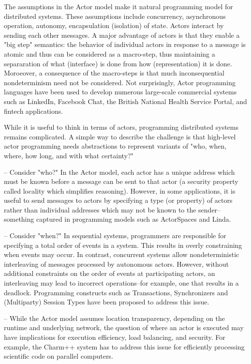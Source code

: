 The assumptions in the Actor model make it natural programming model
for distributed systems.  These assumptions include concurrency,
asynchronous operation, autonomy, encapsulation (isolation) of state.
Actors interact by sending each other messages.  A major advantage of
actors is that they enable a "big step" semantics: the behavior of
individual actors in response to a message is atomic and thus can be
considered as a macro-step, thus maintaining a separaration of what
(interface) is done from how (representation) it is done.  Moroeover,
a consequence of the macro-steps is that much inconsequential
nondeterminism need not be considered.  Not surprisingly, Actor
programming languages have been used to develop numerous large-scale
commercial systems such as LinkedIn, Facebook Chat, the British
National Health Service Portal, and fintech applications.

While it is useful to think in terms of actors, programming
distributed systems remains complicated.  A simple way to describe the
challenge is that high-level actor programming needs abstractions to
represent variants of "who, when, where, how long, and with what
certainty?"

-- Consider "who?"  In the Actor model, each actor has a unique
address which must be known before a message can be sent to that actor
(a security property called locality which simplifies reasoning).
However, in some applications, it is useful to send messages to actors
by specifying a type (or property) of actors rather than individual
addresses which may not be known to the sender--something captured in
programming models such as ActorSpaces and Linda.

-- Consider "when?"  In sequential systems, programmers are
responsible for specifying a total order of events in a system.  This
results in overly constraining when events may occur.  In contrast,
concurrent systems allow nondeterministic interleaving of messages
processed by autonomous actors.  However, without additional
constraints on the order of events at participating actors, an
interleaving may lead to incorrect operations--for example, one that
results in a deadlock.  Programming constructs such as Transactions,
Synchronizers and (Multiparty) Session Types have been proposed to
address this issue.

-- While the Actor model assumes location transparency, depending on
the runtime and underlying network, the question of where an actor is
executed may have implications for execution efficiency, load
balancing, and security.  For example, the Charm++ system has to
address this issue for efficiently processing scientific code on
parallel computers.

